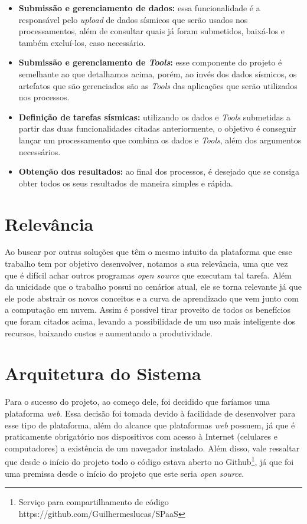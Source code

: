 \documentclass[11pt,twoside]{article}
\begin{document}
\begin{itemize}
  \item \textbf{Submissão e gerenciamento de dados:} essa funcionalidade é a responsável pelo \emph{upload} de dados sísmicos que serão usados nos processamentos, além de consultar quais já foram submetidos, baixá-los e também
  excluí-los, caso necessário. 
  \item \textbf{Submissão e gerenciamento de \emph{Tools}:} esse componente do projeto é semelhante ao que detalhamos acima, porém, ao invés dos dados sísmicos, os artefatos que são gerenciados são as 
  \emph{Tools} das aplicações que serão utilizados nos processos.
  \item \textbf{Definição de tarefas sísmicas:} utilizando os dados e \emph{Tools} submetidas a partir das duas funcionalidades citadas anteriormente, o objetivo é conseguir lançar um processamento que combina os dados e 
  \emph{Tools}, além dos argumentos necessários.
  \item \textbf{Obtenção dos resultados:} ao final dos processos, é desejado que se consiga obter todos os seus resultados de maneira simples e rápida.
\end{itemize}

\section{Relevância}
Ao buscar por outras soluções que têm o mesmo intuito da plataforma que esse trabalho tem por objetivo desenvolver, notamos a sua relevância, uma que vez que é difícil achar outros programas \emph{open source} que executam tal tarefa.
Além da unicidade que o trabalho possui no cenários atual, ele se torna relevante já que ele pode abstrair os novos conceitos e a curva de aprendizado que vem junto com a computação em nuvem. Assim é possível
tirar proveito de todos os benefícios que foram citados acima, levando a possibilidade de um uso mais inteligente dos recursos, baixando custos e aumentando a produtividade.

\section{Arquitetura do Sistema}
Para o sucesso do projeto, ao começo dele, foi decidido que faríamos uma plataforma \emph{web}. Essa decisão  foi tomada devido à facilidade de desenvolver para esse tipo de plataforma, além do alcance que 
plataformas \emph{web} possuem, já que é praticamente obrigatório nos dispositivos com acesso à Internet (celulares e computadores) a existência de um
navegador instalado. Além disso, vale ressaltar que desde o início do projeto todo o código estava aberto no Github\footnote{Serviço para compartilhamento de código https://github.com/Guilhermeslucas/SPaaS}, 
já que foi uma premissa desde o início do projeto que este seria \emph{open source}.
\end{document}
